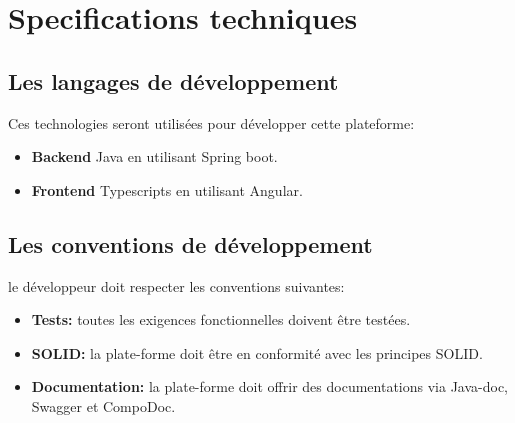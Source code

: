 \documentclass[oneside]{book}
\begin{document}
\newpage
\section{Specifications techniques} 
\subsection{Les langages de développement}
Ces technologies seront utilisées pour développer cette plateforme:
\begin{itemize}
    \item \textbf{Backend} Java en utilisant Spring boot.
    \item \textbf{Frontend} Typescripts en utilisant Angular.
\end{itemize}

\subsection{Les conventions de développement}
le développeur doit respecter les conventions suivantes:
\begin{itemize}
    \item \textbf{Tests:} toutes les exigences fonctionnelles doivent être testées.
    \item \textbf{SOLID:} la plate-forme doit être en conformité avec les principes SOLID.
    \item \textbf{Documentation:} la plate-forme doit offrir des documentations via Java-doc, Swagger et CompoDoc.
\end{itemize}

\printbibliography[title={Références}]
\end{document}
